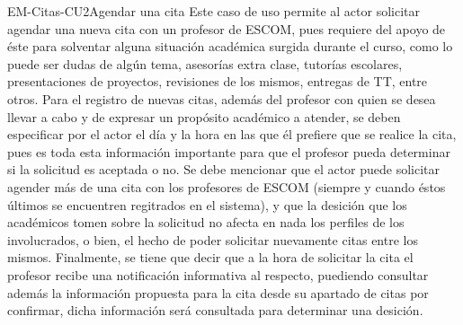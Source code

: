 \begin{UseCase}{EM-Citas-CU2}{Agendar una cita}{
	\noindent
	Este caso de uso permite al actor solicitar agendar una nueva cita con un profesor de ESCOM, pues requiere del apoyo de éste para solventar alguna situación académica surgida durante el curso, como lo puede ser dudas de algún tema, asesorías extra clase, tutorías escolares, presentaciones de proyectos, revisiones de los mismos, entregas de TT, entre otros.
	\newline
	Para el registro de nuevas citas, además del profesor con quien se desea llevar a cabo y de expresar un propósito académico a atender, se deben especificar por el actor el día y la hora en las que él prefiere que se realice la cita, pues es toda esta información importante para que el profesor pueda determinar si la solicitud es aceptada o no.
	\newline
	Se debe mencionar que el actor puede solicitar agender más de una cita con los profesores de ESCOM (siempre y cuando éstos últimos se encuentren regitrados en el sistema), y que la desición que los académicos tomen sobre la solicitud no afecta en nada los perfiles de los involucrados, o bien, el hecho de poder solicitar nuevamente citas entre los mismos. Finalmente, se tiene que decir que a la hora de solicitar la cita el profesor recibe una notificación informativa al respecto, puediendo consultar además la información propuesta para la cita desde su apartado de citas por confirmar, dicha información será consultada para determinar una desición. 
	\newline
	}
\end{UseCase}
